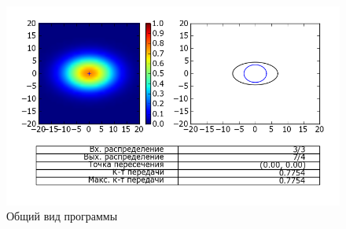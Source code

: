 \begin{figure}[h!]
	\includegraphics[width=\linewidth]{img/heatmap.png}
	\caption{Общий вид программы}
\end{figure}